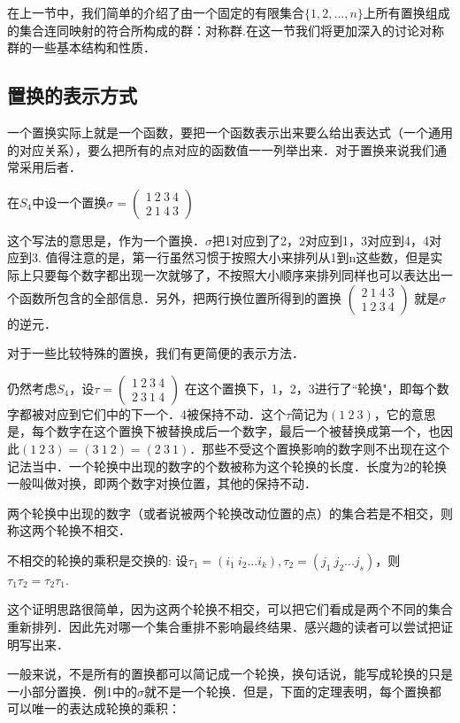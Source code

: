 
  在上一节中，我们简单的介绍了由一个固定的有限集合$\{1, 2, ..., n\}$上所有置换组成的集合连同映射的符合所构成的群：对称群.在这一节我们将更加深入的讨论对称群的一些基本结构和性质．

\subsection{置换的表示方式}
一个置换实际上就是一个函数，要把一个函数表示出来要么给出表达式（一个通用的对应关系），要么把所有的点对应的函数值一一列举出来．对于置换来说我们通常采用后者．
\begin{example}{}
在$S_4$中设一个置换$\sigma=\begin{pmatrix}
1\ 2\ 3\ 4\\ 2\ 1\ 4\ 3
\end{pmatrix}$
\end{example}
这个写法的意思是，作为一个置换．$\sigma$把1对应到了2，2对应到1，3对应到4，4对应到3. 值得注意的是，第一行虽然习惯于按照大小来排列从1到n这些数，但是实际上只要每个数字都出现一次就够了，不按照大小顺序来排列同样也可以表达出一个函数所包含的全部信息．另外，把两行换位置所得到的置换
$\begin{pmatrix}
2\ 1\ 4\ 3\\ 1\ 2\ 3\ 4
\end{pmatrix}$
就是$\sigma$的逆元．


对于一些比较特殊的置换，我们有更简便的表示方法．
\begin{example}{}
仍然考虑$S_4$，设$\tau=\begin{pmatrix}
1\ 2\ 3\ 4\\ 2\ 3\ 1\ 4
\end{pmatrix}$ 在这个置换下，1，2，3进行了“轮换"，即每个数字都被对应到它们中的下一个．4被保持不动．这个$\tau$简记为$(1\ 2\ 3)$，它的意思是，每个数字在这个置换下被替换成后一个数字，最后一个被替换成第一个，也因此$(1\ 2\ 3)=(3\ 1\ 2)=(2\ 3\ 1)$．那些不受这个置换影响的数字则不出现在这个记法当中．一个轮换中出现的数字的个数被称为这个轮换的长度．长度为2的轮换一般叫做对换，即两个数字对换位置，其他的保持不动．
\end{example}

\begin{definition}{}
两个轮换中出现的数字（或者说被两个轮换改动位置的点）的集合若是不相交，则称这两个轮换不相交．
\end{definition}

\begin{lemma}{}
不相交的轮换的乘积是交换的: 设$\tau_1=(i_1\ i_2...i_k), \tau_2=(j_1\ j_2...j_s)$，则$\tau_1\tau_2=\tau_2\tau_1$.
\end{lemma}
这个证明思路很简单，因为这两个轮换不相交，可以把它们看成是两个不同的集合重新排列．因此先对哪一个集合重排不影响最终结果．感兴趣的读者可以尝试把证明写出来．

一般来说，不是所有的置换都可以简记成一个轮换，换句话说，能写成轮换的只是一小部分置换．例1中的$\sigma$就不是一个轮换．但是，下面的定理表明，每个置换都可以唯一的表达成轮换的乘积：
\begin{theorem}{}

\end{theorem}